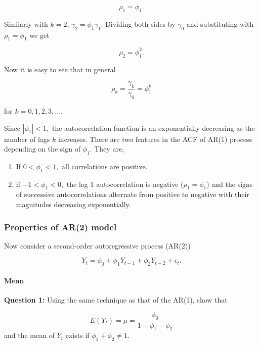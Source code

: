 \documentclass[]{book}
\let\oldparagraph\paragraph
\renewcommand{\paragraph}[1]{\oldparagraph{#1}\mbox{}}
\begin{document}
\[\rho_1=\phi_1.\]

Similarly with \(k=2\), \(\gamma_2 = \phi_1 \gamma_1\). Dividing both sides by \(\gamma_0\) and substituting with \(\rho_1=\phi_1\) we get

\[\rho_2=\phi_1^2.\]

Now it is easy to see that in general

\begin{equation}
\label{eq:acfar1}
\rho_k = \frac{\gamma_k}{\gamma_0}=\phi_1^k 
\end{equation}

for \(k=0, 1, 2, 3, ...\).

Since \(|\phi_1| < 1,\) the autocorrelation function is an exponentially decreasing as the number of lags \(k\) increases. There are two features in the ACF of AR(1) process depending on the sign of \(\phi_1\). They are,

\begin{enumerate}
\def\labelenumi{\arabic{enumi}.}
\item
  If \(0 < \phi_1 < 1,\) all correlations are positive.
\item
  if \(-1 < \phi_1 < 0,\) the lag 1 autocorrelation is negative (\(\rho_1=\phi_1\)) and the signs of successive autocorrelations alternate from positive to negative with their magnitudes decreasing exponentially.
\end{enumerate}

\hypertarget{properties-of-ar2-model}{%
\subsubsection{Properties of AR(2) model}\label{properties-of-ar2-model}}

Now consider a second-order autoregressive process (AR(2))

\begin{equation}
  \label{eq:ar2}
Y_t=\phi_0+\phi_1Y_{t-1}+\phi_2Y_{t-2}+\epsilon_t.
\end{equation}

\hypertarget{mean-1}{%
\paragraph{Mean}\label{mean-1}}

\textbf{Question 1:} Using the same technique as that of the AR(1), show that

\[E(Y_t) = \mu = \frac{\phi_0}{1-\phi_1 - \phi_2}\] and the mean of \(Y_t\) exists if \(\phi_1 + \phi_2 \neq 1\).
\end{document}
